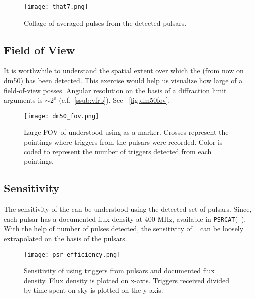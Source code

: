 \begin{figure}
	\centering
	\label{fig:psrdetect}
	\texttt{[image: that7.png]}
	\caption{Collage of averaged pulses from the detected pulsars.}
\end{figure}

\subsection{Field of View}
\label{ssub:fov}

\par It is worthwhile to understand the spatial extent over which the  (from now on dm50) has been detected. 
This exercise would help us visualize how large of a field-of-view \vf posses.
Angular resolution on the basis of a diffraction limit arguments is $\sim 2^o$ (c.f.~\autoref{ssub:vfrb}).
See ~\autoref{fig:dm50fov}. 
\begin{figure}
	\centering
	\label{fig:dm50fov}
	\texttt{[image: dm50\_fov.png]}
	\caption{Large FOV of \vf understood using  as a marker. 
	Crosses represent the pointings where triggers from the pulsars were recorded.
	Color is coded to represent the  number of triggers detected from each pointings.
}
\end{figure}

\subsection {Sensitivity}
\label{ssub:sensitiviy}

\par The sensitivity of the \vf can be understood using the detected set of pulsars.
Since, each pulsar has a documented flux density at $400$ MHz, available in \texttt{PSRCAT}(~\cite{psrcat}).
With the help of number of pulses detected, the sensitivity of \vf~ can be loosely extrapolated on the basis of the pulsars.

\begin{figure}
	\label{fig:psrs400}
	\texttt{[image: psr\_efficiency.png]}
	\caption{Sensitivity of \vf using triggers from pulsars and documented flux density. 
		Flux density is plotted on x-axis. Triggers received divided by time spent on sky is plotted on the y-axis.
	}
\end{figure}
